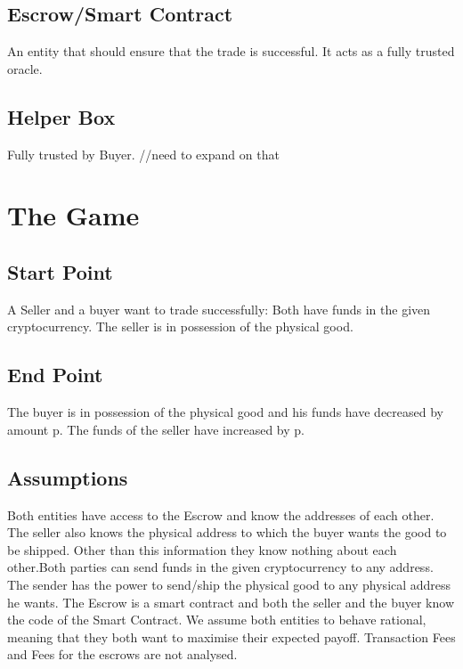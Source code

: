 \documentclass{cacthesis}
\begin{document}

\subsection{Escrow/Smart Contract} An entity that should ensure that the trade is successful. It acts as a fully trusted oracle.

\subsection{Helper Box} Fully trusted by Buyer.  //need to expand on that

\section{The Game}

\subsection{Start Point}
A Seller and a buyer want to trade successfully: Both have funds in the given cryptocurrency. The seller is in possession of the physical good.

\subsection{End Point}
The buyer is in possession of the physical good and his funds have decreased by amount p. The funds of the seller have increased by p.

\subsection{Assumptions}
Both entities have access to the Escrow and know the addresses of each other. The seller also knows the physical address to which the buyer wants the good to be shipped. Other than this information they know nothing about each other.\newline Both parties can send funds in the given cryptocurrency to any address. The sender has the power to send/ship the physical good to any physical address he wants. The Escrow is a smart contract and both the seller and the buyer know the code of the Smart Contract.\newline
We assume both entities to behave rational, meaning that they both want to maximise their expected payoff.\newline
Transaction Fees and Fees for the escrows are not analysed.
\end{document}
